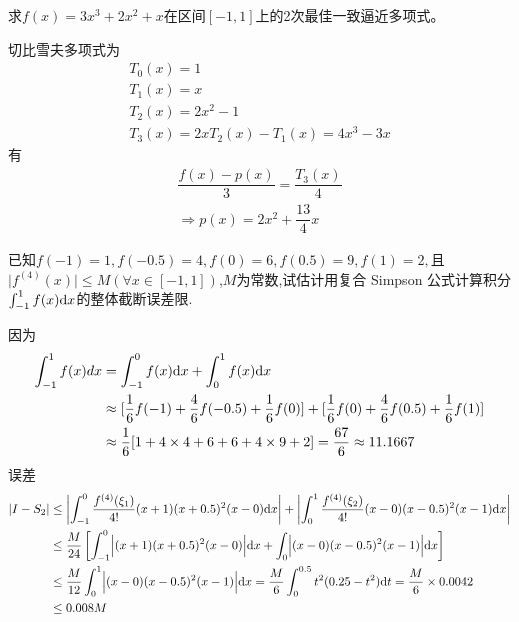 \begin{example}
    求$f\left(x\right)=3x^3+2x^2+x$在区间$\left[-1,1\right]$上的2次最佳一致逼近多项式。
\end{example}
\begin{solution}
    切比雪夫多项式为
    \[
        \begin{array}{l}
            T_{0}(x) = 1\\
            T_{1}(x) = x\\
            T_{2}(x) = 2x^2-1\\
            T_{3}(x) = 2xT_{2}(x)-T_{1}(x) = 4x^3-3x
        \end{array}
    \]
    有
    \[
        \begin{array}{l}
            \dfrac{f(x)-p(x)}{3} = \dfrac{T_{3}(x)}{4}\\
            \Rightarrow p(x) = 2x^2+\dfrac{13}{4}x
        \end{array}
    \]
\end{solution}
\begin{example}
    已知$f(-1)=1,f(-0.5)=4,f(0)=6,f(0.5)=9,f(1)=2,$且$\mid f^{(4)}(x)\mid\leq M(\forall x\in[-1,1])$,$M$为常数,试估计用复合 Simpson 公式计算积分$\int_{-1}^{1}f(x)\mathrm{d} x$的整体截断误差限.
\end{example}
\begin{solution}
    因为
    \[
        \begin{aligned}
            \int_{-1}^{1}f(x)dx& =\int_{-1}^{0}f(x)\mathrm{d} x+\int_{0}^{1}f(x)\mathrm{d} x  \\
            &\approx[\frac{1}{6}f(-1)+\frac{4}{6}f(-0.5)+\frac{1}{6}f(0)]+[\frac{1}{6}f(0)+\frac{4}{6}f(0.5)+\frac{1}{6}f(1)]\\
            &\approx \frac{1}{6}[1+4\times4+6+6+4\times9+2]=\frac{67}{6}\approx 11.1667
        \end{aligned}
    \]
    误差
    \[
        \begin{aligned}
            \left|I-S_{2}\right| & \leq\left|\int_{-1}^{0}\frac{f^{(4)}(\xi_{1})}{4!}(x+1)(x+0.5)^{2}(x-0)\mathrm{d} x\right|+\left|\int_{0}^{1}\frac{f^{(4)}(\xi_{2})}{4!}(x-0)(x-0.5)^{2}(x-1)\mathrm{d} x\right|\\
            &\leq \frac{M}{24}\left[ \int_{-1}^{0}\Bigl|(x+1)(x+0.5)^{2}(x-0)\Bigr|\mathrm{d} x+\int_{0}\Bigl|(x-0)(x-0.5)^{2}(x-1)\Bigr|\mathrm{d} x \right]\\
            &\leq \frac{M}{12}\int_{0}^{1}\Bigl|(x-0)(x-0.5)^{2}(x-1)\Bigr|\mathrm{d} x=\frac{M}{6}\int_{0}^{0.5}t^{2}(0.25-t^{2})\mathrm{d} t=\frac{M}{6}\times0.0042\\
            & \leq 0.008M 
        \end{aligned}
    \]
\end{solution}

